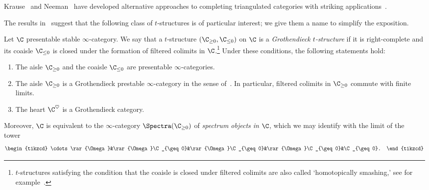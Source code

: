 \documentclass[a4paper]{amsart}
\begin{document}
\begin{remark}
  Krause~\cite{Kra20a} and Neeman~\cite{Nee20} have developed alternative
  approaches to completing triangulated categories with striking
  applications~\cite{Nee18,BCR24}.
\end{remark}

The results in~\cite[Appendix~C]{Lur18SAG} suggest that the following class of
$t$-structures is of particular interest; we give them a name to
simplify the exposition.

\begin{defprop}
  \label{def:Grothendieck_t-structure}
  Let $\C$ presentable stable $\infty$-category. We say that a $t$-structure
  $(\C_{\geq0},\C_{\leq0})$ on $\C$ is a \emph{Grothendieck
    $t$-structure} if it is right-complete and its coaisle $\C_{\leq0}$ is closed under the formation of
  filtered colimits in $\C$.\footnote{$t$-structures satisfying the condition
    that the coaisle is closed under filtered colimits are also called
    `homotopically smashing,' see for example~\cite{SSV23}.} Under these conditions, the following statements hold:
  \begin{enumerate}
  \item \cite[Proposition~1.4.4.13]{Lur17} The aisle $\C_{\geq0}$ and the
    coaisle $\C_{\leq0}$ are presentable
    $\infty$-categories.
  \item \cite[Proposition~C.1.4.1]{Lur18SAG} The aisle $\C_{\geq0}$ is a Grothendieck prestable $\infty$-category in
    the sense of~\cite[Definition~C.1.4.2]{Lur18SAG}. In particular, filtered
    colimits in $\C_{\geq0}$ commute with finite limits.
  \item \cite[Remark~1.3.5.23]{Lur18SAG} The heart $\C^\heartsuit$ is a Grothendieck
    category.
  \end{enumerate}
  Moreover, $\C$ is equivalent to the
  $\infty$-category $\Spectra(\C_{\geq0})$ of \emph{spectrum objects in $\C$},
  which we may identify with the limit of the tower~\cite[Proposition~1.4.2.24]{Lur17}
  \[
    \begin{tikzcd}
      \cdots\rar{\Omega}&\rar{\Omega}\C_{\geq0}&\rar{\Omega}\C_{\geq0}&\rar{\Omega}\C_{\geq0}&\C_{\geq0}.
    \end{tikzcd}
  \]
\end{defprop}

\end{document}
